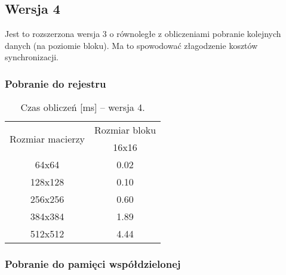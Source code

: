 
\subsection{Wersja 4}

Jest to rozszerzona wersja 3 o równoległe z obliczeniami pobranie kolejnych danych (na poziomie bloku). Ma to spowodować złagodzenie kosztów synchronizacji.

\subsubsection{Pobranie do rejestru}



\begin{table}[H]
\centering
\begin{tabular}{|c|c|}
\hline
\multirow{2}{*}{Rozmiar macierzy} & \multicolumn{1}{c|}{Rozmiar bloku} \\ \cline{2-2}
& 16x16 \\ \hline
64x64 & 0.02 \\ \hline
128x128 & 0.10 \\ \hline
256x256 & 0.60 \\ \hline
384x384 & 1.89 \\ \hline
512x512 & 4.44 \\ \hline
\end{tabular}
\caption{Czas obliczeń [ms] -- wersja 4.}
\end{table}

\subsubsection{Pobranie do pamięci współdzielonej}


